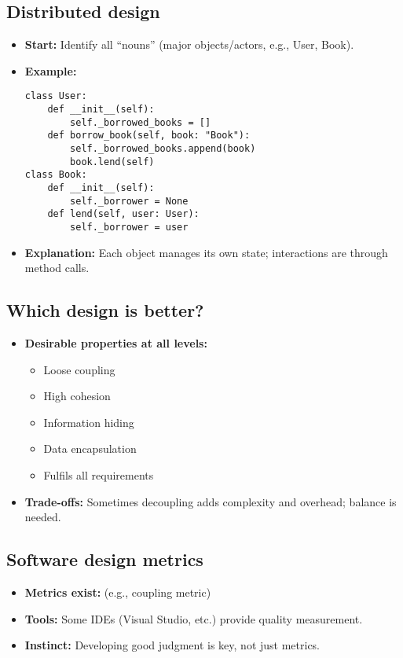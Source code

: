 \documentclass[11pt,a4paper]{article}
\begin{document}
\subsection*{Distributed design}
\begin{itemize}
    \item \textbf{Start:} Identify all ``nouns'' (major objects/actors, e.g., User, Book).
    \item \textbf{Example:} 
        \begin{verbatim}
class User:
    def __init__(self):
        self._borrowed_books = []
    def borrow_book(self, book: "Book"):
        self._borrowed_books.append(book)
        book.lend(self)
class Book:
    def __init__(self):
        self._borrower = None
    def lend(self, user: User):
        self._borrower = user
        \end{verbatim}
    \item \textbf{Explanation:} Each object manages its own state; interactions are through method calls.
\end{itemize}

\subsection*{Which design is better?}
\begin{itemize}
    \item \textbf{Desirable properties at all levels:}
        \begin{itemize}
            \item Loose coupling
            \item High cohesion
            \item Information hiding
            \item Data encapsulation
            \item Fulfils all requirements
        \end{itemize}
    \item \textbf{Trade-offs:} Sometimes decoupling adds complexity and overhead; balance is needed.
\end{itemize}

\subsection*{Software design metrics}
\begin{itemize}
    \item \textbf{Metrics exist:} (e.g., coupling metric)
    \item \textbf{Tools:} Some IDEs (Visual Studio, etc.) provide quality measurement.
    \item \textbf{Instinct:} Developing good judgment is key, not just metrics.
\end{itemize}
\end{document}
